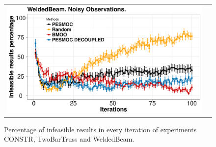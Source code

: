 \begin{figure}[htb]
\begin{tabular}{cc}
                \includegraphics[width=0.475\linewidth]{../Figures/pesmoc/benchmark/WeldedBeam_zeros_noisy} \\
        \end{tabular}
        \caption{Percentage of infeasible results in every iteration of experiments CONSTR, TwoBarTruss and WeldedBeam.}
        \label{fig:benchmark_results_5}
\end{figure}
